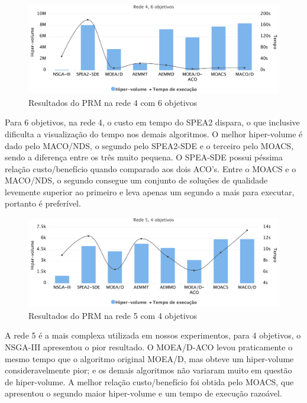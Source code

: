 \begin{figure}[!htbp]
	\caption{Resultados do PRM na rede 4 com 6 objetivos}
	\label{fig_exp4_r4o6}
	\includegraphics[width=1\textwidth]{cap_experimentos/figs/etapa4/r4o6}
\end{figure}

Para 6 objetivos, na rede 4, o custo em tempo do SPEA2 dispara, o que inclusive dificulta a visualização do tempo nos demais algoritmos. O melhor hiper-volume é dado pelo MACO/NDS, o segundo pelo SPEA2-SDE e o terceiro pelo MOACS, sendo a  diferença entre os três muito pequena. O SPEA-SDE possui péssima relação custo/benefício quando comparado aos dois ACO's. Entre o MOACS e o MACO/NDS, o segundo consegue um conjunto de soluções de qualidade levemente superior ao primeiro e leva apenas um segundo a mais para executar, portanto é preferível.

\begin{figure}[!htbp]
	\caption{Resultados do PRM na rede 5 com 4 objetivos}
	\label{fig_exp4_r5o4}
	\includegraphics[width=1\textwidth]{cap_experimentos/figs/etapa4/r5o4}
\end{figure}

A rede 5 é a mais complexa utilizada em nossos experimentos, para 4 objetivos, o NSGA-III apresentou o pior resultado. O MOEA/D-ACO levou praticamente o mesmo tempo que o algoritmo original MOEA/D, mas obteve um hiper-volume consideravelmente pior; e os demais algoritmos não variaram muito em questão de hiper-volume. A melhor relação custo/benefício foi obtida pelo MOACS, que apresentou o segundo maior hiper-volume e um tempo de execução razoável.

